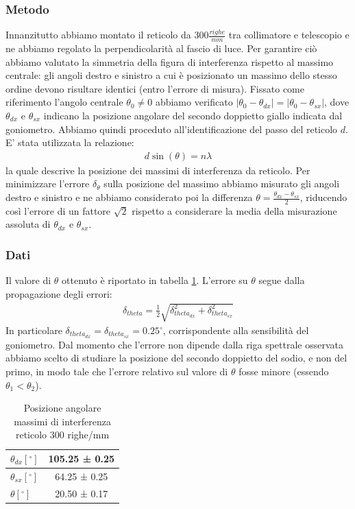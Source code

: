\documentclass[a4paper]{article}
\begin{document}
\subsubsection{Metodo}
Innanzitutto abbiamo montato il reticolo da $300 \frac{righe}{mm}$ tra collimatore e telescopio e ne abbiamo regolato la perpendicolarità al fascio di luce. Per garantire ciò abbiamo valutato la simmetria della figura di interferenza rispetto al massimo centrale: gli angoli destro e sinistro a cui è posizionato un massimo dello stesso ordine devono risultare identici (entro l'errore di misura). Fissato come riferimento l'angolo centrale $\theta_0 \neq 0$ abbiamo verificato $|\theta_0 -\theta_{dx}|=|\theta_0 -\theta_{sx}|$, dove $\theta_{dx}$ e $\theta_{sx}$ indicano la posizione angolare del secondo doppietto giallo indicata dal goniometro. Abbiamo quindi proceduto all'identificazione del passo del reticolo $d$. E' stata utilizzata la relazione:
\begin{align}
 d\sin(\theta) = n\lambda
\label{eq:massimi reticolo}
\end{align}
la quale descrive la posizione dei massimi di interferenza da reticolo. 
Per minimizzare l'errore $\delta_{\theta}$ sulla posizione del massimo abbiamo misurato gli angoli destro e sinistro e ne abbiamo considerato poi la differenza $\theta = \frac{\theta_{dx}-\theta_{sx}}{2}$, riducendo così l'errore di un fattore $\sqrt{2}$ rispetto a considerare la media della misurazione assoluta di $\theta_{dx}$ e $\theta_{sx}$. 

\subsubsection{Dati}
Il valore di $\theta$ ottenuto è riportato in tabella \ref{tab:angoli_d}. L'errore su $\theta$ segue dalla propagazione degli errori:
\begin{align}
\delta_{theta} = \frac{1}{2}\sqrt{\delta_{theta_{dx}}^2+\delta_{theta_{sx}}^2}
\label{eq:err_angolo}
\end{align}
In particolare $\delta_{theta_{dx}} =\delta_{theta_{sx}}= 0.25^\circ$, corrispondente alla sensibilità del goniometro.
Dal momento che l'errore non dipende dalla riga spettrale osservata abbiamo scelto di studiare la posizione del secondo doppietto del sodio, e non del primo, in modo tale che l'errore relativo sul valore di $\theta$ fosse minore (essendo $\theta_1 < \theta_2$).

\begin{table}[htbp]
\centering
\begin{tabular}{|l|c|}
\hline
$\theta_{dx} [^\circ]$ & 105.25 ± 0.25 \\\hline
$\theta_{sx} [^\circ]$ & 64.25 ± 0.25 \\\hline
$\theta [^\circ]$ & 20.50 ± 0.17  \\\hline
\end{tabular}
\caption{Posizione angolare massimi di interferenza reticolo 300 righe/mm}
\label{tab:angoli_d}
\end{table}
\end{document}

